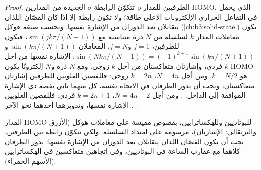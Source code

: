 \begin{proof}
تتكوّن الرابطة $\sigma$ الجديدة من المدارين p الطرفيين للمدار HOMO، الذي يحمل في
التفاعل الحراري الإلكترونات الأعلى طاقة؛ ولا تكون رابطة إلا إذا كان
الفصّان اللذان يتقابلان بعد الدوران من الإشارة نفسها. وبحسب صيغة هوكل
(\cref{ch:b3:solid-state}) تكون معاملات المدار $k$ لسلسلة من $N$ ذرة
متناسبة مع $\sin(jk\pi/(N + 1))$، فيكون للطرفين، $j = 1$ و$j = N$،
المعاملان $\sin(k\pi/(N + 1))$ و$\sin(Nk\pi/(N + 1)) = (-1)^{k+1}\sin(k\pi/(N + 1))$: الإشارة نفسها من أجل $k$ فردي،
وإشارتان متعاكستان من أجل $k$ زوجي. ومع $N$ ذرة و$N$ إلكترونًا يكون HOMO هو
$k = N/2$. ومن أجل $N = 4n$، $k = 2n$ زوجي: فللفصين العلويين للطرفين إشارتان
متعاكستان، ويجب أن يدور الطرفان في الاتجاه نفسه، كل منهما يأتي بفصه ذي
الإشارة الموافقة إلى الداخل: . ومن أجل $N = 4n + 2$، $k = 2n + 1$ فردي: فللفصين العلويين
الإشارة نفسها، وتدويرهما أحدهما نحو الآخر .
\end{proof}

\begin{omfigure}

{\small المدار HOMO للبوتاديين وللهكساترايين، بفصوص مقيسة على
معاملات هوكل (الأزرق والبرتقالي: الإشارتان)، مرسومة على امتداد السلسلة.
ولكي تتكوّن رابطة بين الطرفين، يجب أن يكون الفصّان اللذان يتقابلان بعد الدوران
من الإشارة نفسها: يدور الطرفان كلاهما مع عقارب الساعة في البوتاديين، وفي اتجاهين
متعاكسين في الهكساترايين (الأسهم الحمراء).}
\end{omfigure}

